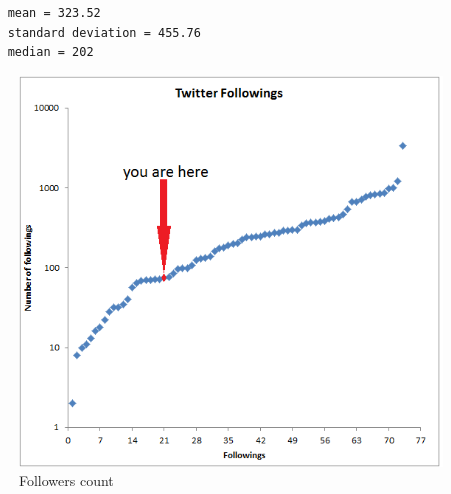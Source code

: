 \documentclass[a4paper,12pt]{article}
\begin{document}
\begin{lstlisting}
	mean = 323.52
	standard deviation = 455.76
	median = 202
\end{lstlisting}

\par

\begin{figure}
	\center
		\includegraphics[width=\linewidth]{TwittersFollowings.png} 
	\caption{Followers count}
\end{figure}
\end{document}
